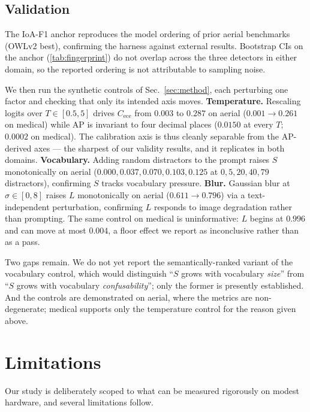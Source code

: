 \documentclass[10pt,twocolumn,letterpaper]{article}
\providecommand{\Cref}[1]{\ref{#1}}
\begin{document}
\subsection{Validation}
\label{sec:validation}
The IoA-F1 anchor reproduces the model ordering of prior aerial benchmarks (OWLv2 best),
confirming the harness against external results. Bootstrap CIs on the anchor
(\Cref{tab:fingerprint}) do not overlap across the three detectors in either domain, so the
reported ordering is not attributable to sampling noise.

We then run the synthetic controls of Sec.~\ref{sec:method}, each perturbing one factor and
checking that only its intended axis moves.
\textbf{Temperature.} Rescaling logits over $T{\in}[0.5,5]$ drives $C_{\mathrm{ece}}$ from
$0.003$ to $0.287$ on aerial ($0.001{\to}0.261$ on medical) while AP is invariant to four
decimal places ($0.0150$ at every $T$; $0.0002$ on medical). The calibration axis is thus
cleanly separable from the AP-derived axes --- the sharpest of our validity results, and it
replicates in both domains.
\textbf{Vocabulary.} Adding random distractors to the prompt raises $S$ monotonically on
aerial ($0.000, 0.037, 0.070, 0.103, 0.125$ at $0, 5, 20, 40, 79$ distractors), confirming
$S$ tracks vocabulary pressure.
\textbf{Blur.} Gaussian blur at $\sigma{\in}[0,8]$ raises $L$ monotonically on aerial
($0.611{\to}0.796$) via a text-independent perturbation, confirming $L$ responds to image
degradation rather than prompting. The same control on medical is uninformative: $L$ begins
at $0.996$ and can move at most $0.004$, a floor effect we report as inconclusive rather
than as a pass.

Two gaps remain. We do not yet report the semantically-ranked variant of the vocabulary
control, which would distinguish ``$S$ grows with vocabulary \emph{size}'' from ``$S$ grows
with vocabulary \emph{confusability}''; only the former is presently established. And the
controls are demonstrated on aerial, where the metrics are non-degenerate; medical supports
only the temperature control for the reason given above.

\section{Limitations}
\label{sec:limitations}
Our study is deliberately scoped to what can be measured rigorously on modest hardware, and
several limitations follow.
\end{document}
